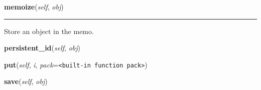     \vspace{0.5ex}

\hspace{.8\funcindent}\begin{boxedminipage}{\funcwidth}

    \raggedright \textbf{memoize}(\textit{self}, \textit{obj})

    \vspace{-1.5ex}

    \rule{\textwidth}{0.5\fboxrule}
\setlength{\parskip}{2ex}
    Store an object in the memo.

\setlength{\parskip}{1ex}
    \end{boxedminipage}

    \label{pickle:Pickler:persistent_id}

    \vspace{0.5ex}

\hspace{.8\funcindent}\begin{boxedminipage}{\funcwidth}

    \raggedright \textbf{persistent\_id}(\textit{self}, \textit{obj})

\setlength{\parskip}{2ex}
\setlength{\parskip}{1ex}
    \end{boxedminipage}

    \label{pickle:Pickler:put}

    \vspace{0.5ex}

\hspace{.8\funcindent}\begin{boxedminipage}{\funcwidth}

    \raggedright \textbf{put}(\textit{self}, \textit{i}, \textit{pack}={\tt {\textless}built-in function pack{\textgreater}})

\setlength{\parskip}{2ex}
\setlength{\parskip}{1ex}
    \end{boxedminipage}

    \label{pickle:Pickler:save}

    \vspace{0.5ex}

\hspace{.8\funcindent}\begin{boxedminipage}{\funcwidth}

    \raggedright \textbf{save}(\textit{self}, \textit{obj})

\setlength{\parskip}{2ex}
\setlength{\parskip}{1ex}
    \end{boxedminipage}

